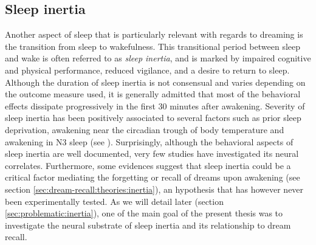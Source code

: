 \subsection{Sleep inertia}
\label{sec:dream-research:sleep:inertia}

Another aspect of sleep that is particularly relevant with regards to dreaming is the transition from sleep to wakefulness. This transitional period between sleep and wake is often referred to as \emph{sleep inertia}, and is marked by impaired cognitive and physical performance, reduced vigilance, and a desire to return to sleep. Although the duration of sleep inertia is not consensual and varies depending on the outcome measure used, it is generally admitted that most of the behavioral effects dissipate progressively in the first 30 minutes after awakening. Severity of sleep inertia has been positively associated to several factors such as prior sleep deprivation, awakening near the circadian trough of body temperature and awakening in N3 sleep (see \citealp{tassi_sleep_2000, trotti_waking_2016}). Surprisingly, although the behavioral aspects of sleep inertia are well documented, very few studies have investigated its neural correlates. Furthermore, some evidences suggest that sleep inertia could be a critical factor mediating the forgetting or recall of dreams upon awakening (see section \ref{sec:dream-recall:theories:inertia}), an hypothesis that has however never been experimentally tested. As we will detail later (section \ref{sec:problematic:inertia}), one of the main goal of the present thesis was to investigate the neural substrate of sleep inertia and its relationship to dream recall.


